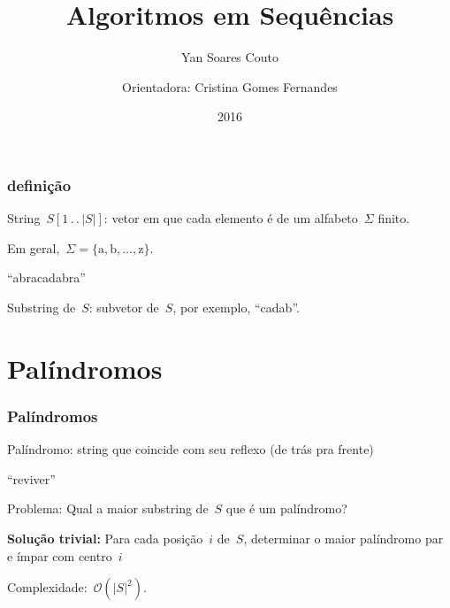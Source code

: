 \documentclass[10pt, compress]{beamer}
\title{Algoritmos em Sequências}
\subtitle{Yan Soares Couto}
\date{2016}
\author{Orientadora: Cristina Gomes Fernandes}
\institute{Instituto de Matemática e Estatística}
\newcommand{\tdots}{\,.\,.\,} %
\newcommand{\E}{\Sigma}
\newcommand{\Oh}{\mathcal{O}}
\begin{document}
\maketitle

\begin{frame}[fragile]
  \frametitle{definição}

String~$S[1\tdots|S|]$: vetor em que cada elemento é de um alfabeto~$\E$ finito.

Em geral,~$\E = \{\text{a}, \text{b}, \ldots, \text{z}\}$.

\pause
\begin{center}
{\huge ``abracadabra''}
\end{center}

Substring de~$S$: subvetor de~$S$, por exemplo, {\large``cadab''}.

\end{frame}

\section{Palíndromos}

\begin{frame}[fragile]
  \frametitle{Palíndromos}
  
Palíndromo: string que coincide com seu reflexo (de trás pra frente)
  
\begin{center}
{\huge ``reviver''}
\end{center}

\alert{Problema:} Qual a maior substring de~$S$ que é um palíndromo?

\pause
\vspace{2ex}\textbf{Solução trivial:} Para cada posição~$i$ de~$S$, determinar o maior palíndromo par e ímpar com centro~$i$

Complexidade:~$\Oh(|S|^2)$.

\end{frame}
\end{document}
